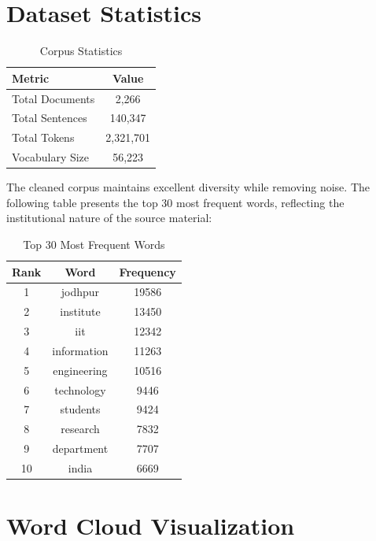\documentclass[11pt,a4paper]{report}
\begin{document}
\section{Dataset Statistics}

\begin{table}[H]
    \centering
    \caption{Corpus Statistics}
    \label{tab:corpus_stats}
    \begin{tabular}{lc}
        \toprule
        \textbf{Metric} & \textbf{Value} \\
        \midrule
        Total Documents & 2,266 \\
        Total Sentences & 140,347 \\
        Total Tokens & 2,321,701 \\
        Vocabulary Size & 56,223 \\
        \bottomrule
    \end{tabular}
\end{table}

The cleaned corpus maintains excellent diversity while removing noise. The following table presents the top 30 most frequent words, reflecting the institutional nature of the source material:

\begin{table}[H]
    \centering
    \caption{Top 30 Most Frequent Words}
    \label{tab:top_words}
    \begin{tabular}{|c|c|c|}
        \hline
        \textbf{Rank} & \textbf{Word} & \textbf{Frequency} \\
        \hline
        1 & jodhpur & 19586 \\
        2 & institute & 13450 \\
        3 & iit & 12342 \\
        4 & information & 11263 \\
        5 & engineering & 10516 \\
        6 & technology & 9446 \\
        7 & students & 9424 \\
        8 & research & 7832 \\
        9 & department & 7707 \\
        10 & india & 6669 \\
        \hline
    \end{tabular}
\end{table}

\section{Word Cloud Visualization}
\end{document}
